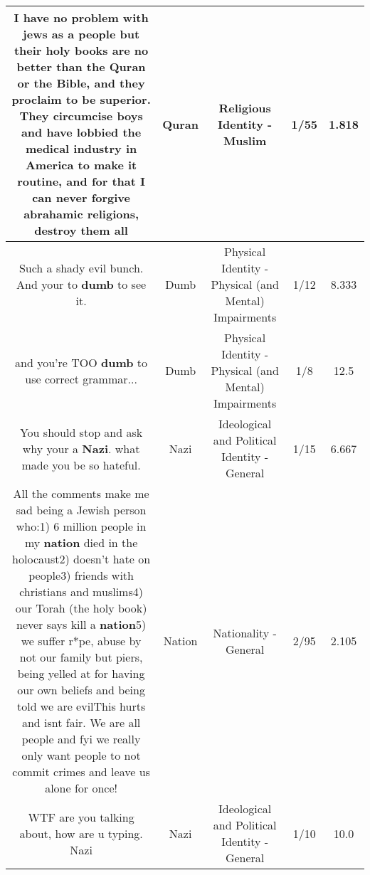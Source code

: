 \documentclass[11pt]{article}
\newlength\mylength
\begin{document}
\begin{center}
\begin{longtable}{|C{.65\mylength}|C{.30\mylength}|C{.12\mylength}|C{.12\mylength}|C{.12\mylength}|}
  \small I have no problem with jews as a people but their holy books are no better than the \textbf{Quran} or the Bible, and they proclaim to be superior. They circumcise boys and have lobbied the medical industry in America to make it routine, and for that I can never forgive abrahamic religions, destroy them all\normalsize   & Quran & Religious Identity - Muslim & 1/55 & 1.818 \\  \hline
  \small Such a shady evil bunch. And your to \textbf{dumb} to see it.\normalsize   & Dumb & Physical Identity - Physical (and Mental) Impairments & 1/12 & 8.333 \\  \hline
  \small and you're TOO \textbf{dumb} to use correct grammar...\normalsize   & Dumb & Physical Identity - Physical (and Mental) Impairments & 1/8 & 12.5 \\  \hline
  \small You should stop and ask why your a \textbf{Nazi}. what made you be so hateful.\normalsize   & Nazi &  Ideological and Political Identity - General & 1/15 & 6.667 \\  \hline
  \small All the comments make me sad being a Jewish person who:1) 6 million people in my \textbf{nation} died in the holocaust2) doesn't hate on people3) friends with christians and muslims4) our Torah (the holy book) never says kill a \textbf{nation}5) we suffer r*pe, abuse by not our family but piers, being yelled at for having our own beliefs and being told we are evilThis hurts and isnt fair. We are all people and fyi we really only want people to not commit crimes and leave us alone for once!\normalsize   & Nation & Nationality - General & 2/95 & 2.105 \\  \hline
  \small WTF are you talking about, how are u typing. Nazi\normalsize   & Nazi &  Ideological and Political Identity - General & 1/10 & 10.0 \\  \hline

\end{longtable}
\end{center}
\end{document}
